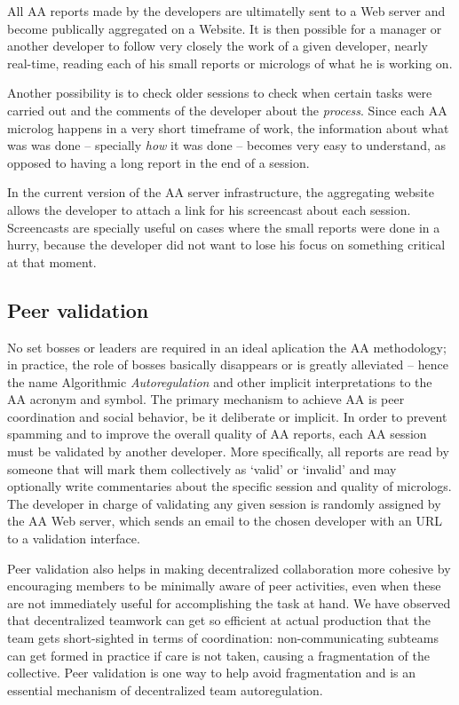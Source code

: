 \documentclass{article}
\begin{document}
All AA reports made by the developers are ultimatelly sent to a Web server and
become publically aggregated on a Website. It is then possible for a manager or another
developer to follow very closely the work of a given developer, nearly real-time,
reading each of his small reports or micrologs of what he is working on.

Another possibility is to check older sessions to check when certain tasks
were carried out and the comments of the developer about the \emph{process}.
Since each AA microlog happens in a very short timeframe of work, the information
about what was was done -- specially \emph{how} it was done -- becomes very easy to
understand, as opposed to having a long report in the end of a session.

In the current version of the AA server infrastructure, the aggregating
website allows the developer to attach a link for his
screencast about each session. Screencasts are specially useful on cases where
the small reports were done in a hurry, because the developer did not want to
lose his focus on something critical at that moment.

\subsection{Peer validation}

No set bosses or leaders are required in an ideal aplication the AA methodology;
in practice, the role of bosses basically disappears or is greatly alleviated --
hence the name Algorithmic \emph{Autoregulation} and other implicit
interpretations to the AA acronym and symbol. The primary mechanism to achieve
AA is peer coordination and social behavior, be it deliberate or implicit. In
order to prevent spamming and to improve the overall quality of AA reports, each
AA session must be validated by another developer. More specifically, all
reports are read by someone that will mark them collectively as `valid' or
`invalid' and may optionally write commentaries about the specific session and
quality of micrologs. The developer in charge of validating any given session is
randomly assigned by the AA Web server, which sends an email to the chosen
developer with an URL to a validation interface. 

Peer validation also helps in making decentralized collaboration more cohesive
by encouraging members to be minimally aware of peer activities, even when these
are not immediately useful for accomplishing the task at hand.  We have observed
that decentralized teamwork can get so efficient at actual production that 
the team gets short-sighted in terms of coordination: non-communicating
subteams can get formed in practice if care is not taken, causing a
fragmentation of the collective. Peer validation is one way to help avoid
fragmentation and is an essential mechanism of decentralized team autoregulation.
\end{document}
